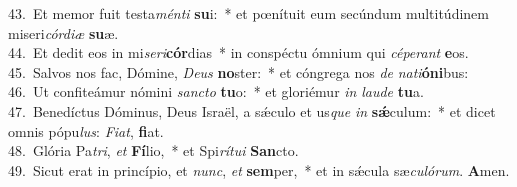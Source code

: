 {43.~}Et memor fuit testa\textit{mén}\textit{ti} \textbf{su}i:~* et pœnítuit eum secúndum multitúdinem miseri\textit{cór}\textit{di}\textit{æ} \textbf{su}æ.\\
{44.~}Et dedit eos in mi\textit{se}\textit{ri}\textbf{cór}dias~* in conspéctu ómnium qui \textit{cé}\textit{pe}\textit{rant} \textbf{e}os.\\
{45.~}Salvos nos fac, Dómine, \textit{De}\textit{us} \textbf{no}ster:~* et cóngrega nos \textit{de} \textit{na}\textit{ti}\textbf{ó}\textbf{ni}bus:\\
{46.~}Ut confiteámur nómini \textit{san}\textit{cto} \textbf{tu}o:~* et gloriémur \textit{in} \textit{lau}\textit{de} \textbf{tu}a.\\
{47.~}Benedíctus Dóminus, Deus Israël, a sǽculo et us\textit{que} \textit{in} \textbf{sǽ}culum:~* et dicet omnis pópu\textit{lus}: \textit{Fi}\textit{at}, \textbf{fi}at.\\
{48.~}Glória Pa\textit{tri}, \textit{et} \textbf{Fí}lio,~* et Spi\textit{rí}\textit{tu}\textit{i} \textbf{San}cto.\\
{49.~}Sicut erat in princípio, et \textit{nunc}, \textit{et} \textbf{sem}per,~* et in sǽcula sæ\textit{cu}\textit{ló}\textit{rum}. \textbf{A}men.\\
